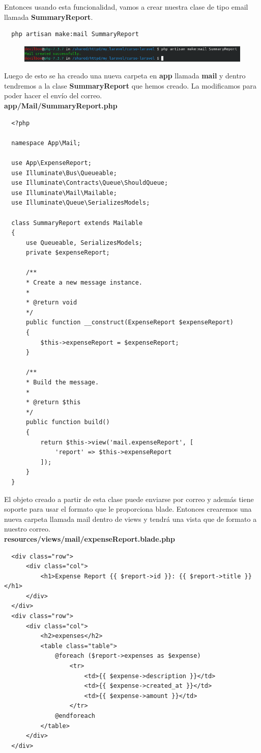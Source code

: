\documentclass{article}
\begin{document}
Entonces usando esta funcionalidad, vamos a crear nuestra clase de tipo email
llamada \textbf{SummaryReport}.

\begin{verbatim}
  php artisan make:mail SummaryReport
\end{verbatim}

\begin{figure}[h!]
  \centering
  \includegraphics[scale=0.75]{./Pictures/129_make_mail_created.png}
\end{figure}

Luego de esto se ha creado una nueva carpeta en \textbf{app} llamada
\textbf{mail} y dentro tendremos a la clase \textbf{SummaryReport} que hemos
creado. La modificamos para poder hacer el envío del correo.\\

\textbf{app/Mail/SummaryReport.php}
\begin{verbatim}
  <?php

  namespace App\Mail;

  use App\ExpenseReport;
  use Illuminate\Bus\Queueable;
  use Illuminate\Contracts\Queue\ShouldQueue;
  use Illuminate\Mail\Mailable;
  use Illuminate\Queue\SerializesModels;

  class SummaryReport extends Mailable
  {
      use Queueable, SerializesModels;
      private $expenseReport;

      /**
      * Create a new message instance.
      *
      * @return void
      */
      public function __construct(ExpenseReport $expenseReport)
      {
          $this->expenseReport = $expenseReport;
      }

      /**
      * Build the message.
      *
      * @return $this
      */
      public function build()
      {
          return $this->view('mail.expenseReport', [
              'report' => $this->expenseReport
          ]);
      }
  }
\end{verbatim}

El objeto creado a partir de esta clase puede enviarse por correo y además
tiene soporte para usar el formato que le proporciona blade. Entonces crearemos
una nueva carpeta llamada mail dentro de views y tendrá una vista que de
formato a nuestro correo.\\

\textbf{resources/views/mail/expenseReport.blade.php}
\begin{verbatim}
  <div class="row">
      <div class="col">
          <h1>Expense Report {{ $report->id }}: {{ $report->title }}</h1>
      </div>
  </div>
  <div class="row">
      <div class="col">
          <h2>expenses</h2>
          <table class="table">
              @foreach ($report->expenses as $expense)
                  <tr>
                      <td>{{ $expense->description }}</td>
                      <td>{{ $expense->created_at }}</td>
                      <td>{{ $expense->amount }}</td>
                  </tr>
              @endforeach
          </table>
      </div>
  </div>
\end{verbatim}
\end{document}
